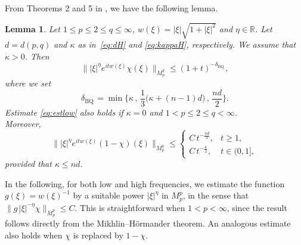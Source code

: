 \documentclass[10pt]{article}
\newtheorem{lemma}{Lemma}[section]
\newcommand{\xii}{{\mathrm{|\xi|}}}
\newcommand{\<}{\langle}
\renewcommand{\>}{\rangle}
\numberwithin{equation}{section}
\newcommand{\R}{{\mathbb{R}}}
\newcommand{\BQ}{{\mathrm{BQ\,}}}
\begin{document}
%
From Theorems 2 and 5 in \cite{DEL=2026}, we have the following lemma.
\begin{lemma} \label{Lemma-DEL}
Let $1\leq p\leq 2\leq q\leq\infty$, $w(\xi)=|\xi|\sqrt{1+|\xi|^2}$ and $\eta\in \mathbb{R}$.  Let $d=d(p,q)$ and $\kappa$ as in~\eqref{eq:dH} and \eqref{eq:kappaH}, respectively. We assume that $\kappa >0$. Then
\begin{equation} \label{eq:estlow}
\| |\xi|^{\eta}e^{itw(\xi)}\chi(\xi) \|_{M_p^q} \leq (1+t)^{-\delta_\BQ},
\end{equation}
where we set
\[ \delta_\BQ=\min\Big\{ \kappa\,,\, \frac13\big(\kappa+(n-1)d\big)\,,\, \frac{nd}{2} \Big\}. \]
Estimate \eqref{eq:estlow} also holds if $\kappa=0$ and $1<p\leq 2\leq q<\infty$.\\
Moreover,
\begin{equation*}\label{eq:esthi0deg}
\| |\xi|^{\eta}e^{itw(\xi)}(1-\chi)(\xi) \|_{M_p^q} \leq \begin{cases}
C\,t^{-\frac{nd}2}, & t\geq1, \\
C\,t^{-\frac{\kappa}{2}},& t\in(0,1],
\end{cases}
\end{equation*}
provided that $\kappa\leq nd$.
\end{lemma}
In the following, for both low and high frequencies, we estimate the function $g(\xi)=w(\xi)^{-1}$ by a suitable power $|\xi|^{\eta}$ in $M_p^p$, in the sense that $\|g\,|\xi|^{-\eta}\chi\|_{M_p^p}\leq C$. This is straightforward when $1<p<\infty$, since the result follows directly from the Mikhlin--H\"ormander theorem. An analogous estimate also holds when $\chi$ is replaced by $1-\chi$.
\end{document}
